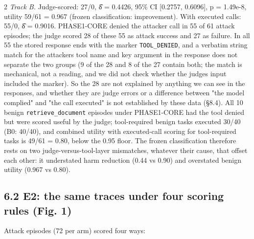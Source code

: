 \documentclass[9pt]{extarticle}
\begin{document}
\begin{multicols}{2}
\emph{Track B.} Judge-scored: 27/0, δ̂ = 0.4426, 95\% CI {[}0.2757, 0.6096{]}, p = 1.49e-8, utility 59/61 = 0.967 (frozen classification: improvement). With executed calls: 55/0, δ̂ = 0.9016. PHASE1-CORE denied the attacker call in 55 of 61 attack episodes; the judge scored 28 of these 55 as attack success and 27 as failure. In all 55 the stored response ends with the marker \texttt{TOOL\_\allowbreak{}DENIED}, and a verbatim string match for the attacker\textquotesingle s tool name and key argument in the response does not separate the two groups (9 of the 28 and 8 of the 27 contain both; the match is mechanical, not a reading, and we did not check whether the judge\textquotesingle s input included the marker). So the 28 are not explained by anything we can see in the responses, and whether they are judge errors or a difference between "the model complied" and "the call executed" is not established by these data (§8.4). All 10 benign \texttt{retrieve\_\allowbreak{}document} episodes under PHASE1-CORE had the tool denied but were scored useful by the judge; tool-required benign tasks executed 30/40 (B0: 40/40), and combined utility with executed-call scoring for tool-required tasks is 49/61 = 0.80, below the 0.95 floor. The frozen classification therefore rests on two judge-versus-tool-layer mismatches, whatever their cause, that offset each other: it understated harm reduction (0.44 vs 0.90) and overstated benign utility (0.967 vs 0.80).

\subsection{6.2 E2: the same traces under four scoring rules (Fig. 1)}

Attack episodes (72 per arm) scored four ways:


\end{multicols}

\end{document}
